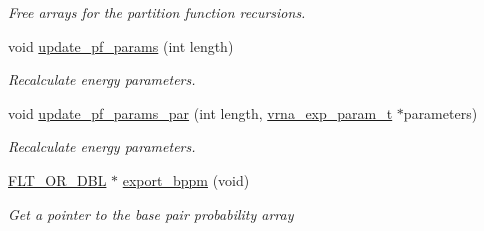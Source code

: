 \begin{DoxyCompactItemize}
\begin{DoxyCompactList}\small\item\em Free arrays for the partition function recursions. \end{DoxyCompactList}\item 
void \hyperlink{group__pf__fold_ga384e927890f9c034ff09fa66da102d28}{update\+\_\+pf\+\_\+params} (int length)
\begin{DoxyCompactList}\small\item\em Recalculate energy parameters. \end{DoxyCompactList}\item 
void \hyperlink{group__pf__fold_gaafe2d1b21f5418b123b088aa395e827d}{update\+\_\+pf\+\_\+params\+\_\+par} (int length, \hyperlink{group__energy__parameters_ga01d8b92fe734df8d79a6169482c7d8d8}{vrna\+\_\+exp\+\_\+param\+\_\+t} $\ast$parameters)
\begin{DoxyCompactList}\small\item\em Recalculate energy parameters. \end{DoxyCompactList}\item 
\hyperlink{group__data__structures_ga31125aeace516926bf7f251f759b6126}{F\+L\+T\+\_\+\+O\+R\+\_\+\+D\+B\+L} $\ast$ \hyperlink{group__pf__fold_gac5ac7ee281aae1c5cc5898a841178073}{export\+\_\+bppm} (void)
\begin{DoxyCompactList}\small\item\em Get a pointer to the base pair probability array


\end{DoxyCompactList}
\end{DoxyCompactItemize}
